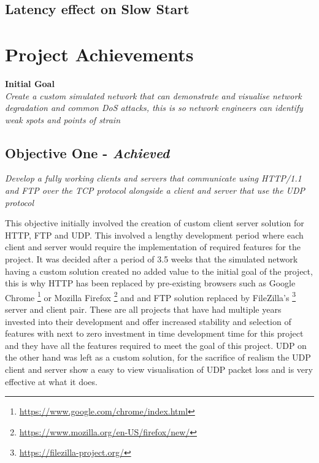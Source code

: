 \subsection{Latency effect on Slow Start}


\clearpage
\section{Project Achievements}

{\bf Initial Goal}\\
{\it Create a custom simulated network that can demonstrate and visualise network degradation and common DoS attacks, this is so network engineers can identify weak spots and points of strain}

\newcommand{\chromeUrl}{\url{https://www.google.com/chrome/index.html}}
\newcommand{\firefoxUrl}{\url{https://www.mozilla.org/en-US/firefox/new/}}
\newcommand{\fileZillaUrl}{\url{https://filezilla-project.org/}}

\subsection{Objective One - {\it Achieved}}
{\it Develop a fully working clients and servers that communicate using HTTP/1.1 and FTP over the TCP protocol alongside a client and server that use the UDP protocol}

This objective initially involved the creation of custom client server solution for HTTP, FTP and UDP. This involved a lengthy development period where each client and server would require the implementation of required features for the project. It was decided after a period of 3.5 weeks that the simulated network having a custom solution created no added value to the initial goal of the project, this is why HTTP has been replaced by pre-existing browsers such as Google Chrome \footnote{\chromeUrl} or Mozilla Firefox \footnote{\firefoxUrl} and and FTP solution replaced by FileZilla's \footnote{\fileZillaUrl} server and client pair. These are all projects that have had multiple years invested into their development and offer increased stability and selection of features with next to zero investment in time development time for this project and they have all the features required to meet the goal of this project. UDP on the other hand was left as a custom solution, for the sacrifice of realism the UDP client and server show a easy to view visualisation of UDP packet loss and is very effective at what it does.

